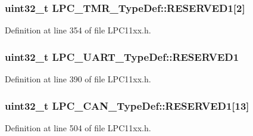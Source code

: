 \subsubsection[{\texorpdfstring{R\+E\+S\+E\+R\+V\+E\+D1}{RESERVED1}}]{\setlength{\rightskip}{0pt plus 5cm}uint32\+\_\+t L\+P\+C\+\_\+\+T\+M\+R\+\_\+\+Type\+Def\+::\+R\+E\+S\+E\+R\+V\+E\+D1\mbox{[}2\mbox{]}}\hypertarget{group___l_p_c11xx___definitions_ga9a4fb508969702f0f6768a515dd3a08a}{}\label{group___l_p_c11xx___definitions_ga9a4fb508969702f0f6768a515dd3a08a}


Definition at line 354 of file L\+P\+C11xx.\+h.

\subsubsection[{\texorpdfstring{R\+E\+S\+E\+R\+V\+E\+D1}{RESERVED1}}]{\setlength{\rightskip}{0pt plus 5cm}uint32\+\_\+t L\+P\+C\+\_\+\+U\+A\+R\+T\+\_\+\+Type\+Def\+::\+R\+E\+S\+E\+R\+V\+E\+D1}\hypertarget{group___l_p_c11xx___definitions_ga2df6c0a645ba420331a1d6c1a7d32785}{}\label{group___l_p_c11xx___definitions_ga2df6c0a645ba420331a1d6c1a7d32785}


Definition at line 390 of file L\+P\+C11xx.\+h.

\subsubsection[{\texorpdfstring{R\+E\+S\+E\+R\+V\+E\+D1}{RESERVED1}}]{\setlength{\rightskip}{0pt plus 5cm}uint32\+\_\+t L\+P\+C\+\_\+\+C\+A\+N\+\_\+\+Type\+Def\+::\+R\+E\+S\+E\+R\+V\+E\+D1\mbox{[}13\mbox{]}}\hypertarget{group___l_p_c11xx___definitions_ga67db9e4622642f886f81d4225bfd6ca3}{}\label{group___l_p_c11xx___definitions_ga67db9e4622642f886f81d4225bfd6ca3}


Definition at line 504 of file L\+P\+C11xx.\+h.


